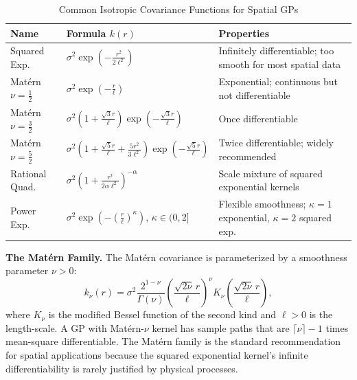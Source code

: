 \documentclass[conference]{IEEEtran}
\begin{document}
\begin{table}[t]
\caption{Common Isotropic Covariance Functions for Spatial GPs}
\label{tab:kernels}
\centering
\renewcommand{\arraystretch}{1.3}
\begin{tabular}{@{}llp{3.8cm}@{}}
\toprule
\textbf{Name} & \textbf{Formula} $k(r)$ & \textbf{Properties} \\
\midrule
Squared Exp. & $\sigma^2 \exp\!\left(-\tfrac{r^2}{2\ell^2}\right)$ & Infinitely differentiable; too smooth for most spatial data \\
\addlinespace
Mat\'{e}rn $\nu=\tfrac{1}{2}$ & $\sigma^2 \exp\!\left(-\tfrac{r}{\ell}\right)$ & Exponential; continuous but not differentiable \\
\addlinespace
Mat\'{e}rn $\nu=\tfrac{3}{2}$ & $\sigma^2\!\left(1+\tfrac{\sqrt{3}r}{\ell}\right)\exp\!\left(-\tfrac{\sqrt{3}r}{\ell}\right)$ & Once differentiable \\
\addlinespace
Mat\'{e}rn $\nu=\tfrac{5}{2}$ & $\sigma^2\!\left(1+\tfrac{\sqrt{5}r}{\ell}+\tfrac{5r^2}{3\ell^2}\right)\exp\!\left(-\tfrac{\sqrt{5}r}{\ell}\right)$ & Twice differentiable; widely recommended \\
\addlinespace
Rational Quad. & $\sigma^2\!\left(1+\tfrac{r^2}{2\alpha\ell^2}\right)^{-\alpha}$ & Scale mixture of squared exponential kernels \\
\addlinespace
Power Exp. & $\sigma^2 \exp\!\left(-\left(\tfrac{r}{\ell}\right)^\kappa\right)$, $\kappa\in(0,2]$ & Flexible smoothness; $\kappa=1$ exponential, $\kappa=2$ squared exp. \\
\bottomrule
\end{tabular}
\end{table}

\textbf{The Mat\'{e}rn Family.} The Mat\'{e}rn covariance \cite{matern1960spatial} is parameterized by a smoothness parameter $\nu > 0$:
\begin{equation}
  k_\nu(r) = \sigma^2 \frac{2^{1-\nu}}{\Gamma(\nu)}\left(\frac{\sqrt{2\nu}\,r}{\ell}\right)^\nu K_\nu\!\left(\frac{\sqrt{2\nu}\,r}{\ell}\right),
  \label{eq:matern}
\end{equation}
where $K_\nu$ is the modified Bessel function of the second kind and $\ell > 0$ is the length-scale. A GP with Mat\'{e}rn-$\nu$ kernel has sample paths that are $\lceil\nu\rceil - 1$ times mean-square differentiable. The Mat\'{e}rn family is the standard recommendation for spatial applications \cite{stein1999interpolation} because the squared exponential kernel's infinite differentiability is rarely justified by physical processes.
\end{document}
